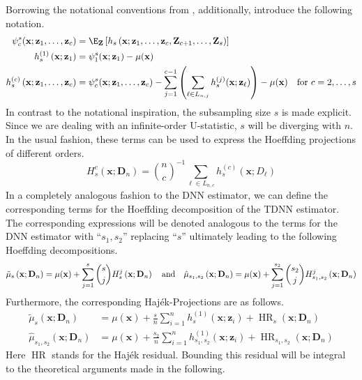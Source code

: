 Borrowing the notational conventions from \citet{lee_u-statistics_2019}, additionally, introduce the following notation.
\begin{align}
	\psi_{c}^{s}(\mathbf{x}; \mathbf{z}_{1}, \dotsc, \mathbf{z}_{c})
	 & = \E_{\mathbf{Z}}\left[h_{s}\left(\mathbf{x}; \mathbf{z}_{1}, \dotsc, \mathbf{z}_{c}, \mathbf{Z}_{c+1}, \dotsc, \mathbf{Z}_{s}\right)\right]                                            \\
	h_{s}^{(1)}\left(\mathbf{x}; \mathbf{z}_{1}\right)
	 & = \psi_{1}^{s}(\mathbf{x}; \mathbf{z}_{1}) - \mu(\mathbf{x})                                                                                                                            \\
	h_{s}^{(c)}\left(\mathbf{x}; \mathbf{z}_{1}, \dotsc, \mathbf{z}_{c}\right)
	 & = \psi_{c}^{s}(\mathbf{x}; \mathbf{z}_{1}, \dotsc, \mathbf{z}_{c}) - \sum_{j = 1}^{c-1}\left(\sum_{\ell \in L_{n,j}}h_{s}^{(j)}(\mathbf{x}; \mathbf{z}_{\ell})\right) - \mu(\mathbf{x})
	\quad \text{for } c = 2, \dotsc, s
\end{align}
In contrast to the notational inspiration, the subsampling size $s$ is made explicit.
Since we are dealing with an infinite-order U-statistic, $s$ will be diverging with $n$.
In the usual fashion, these terms can be used to express the Hoeffding projections of different orders.
\begin{equation}
	H_{s}^{c}\left(\mathbf{x}; \mathbf{D}_n\right)
	= \binom{n}{c}^{-1} \sum_{\ell \in L_{n,c}} h^{(c)}_{s}(\mathbf{x}; D_{\ell})
\end{equation}
In a completely analogous fashion to the DNN estimator, we can define the corresponding terms for the Hoeffding decomposition of the TDNN estimator.
The corresponding expressions will be denoted analogous to the terms for the DNN estimator with ``$s_1, s_2$'' replacing ``$s$'' ultimately leading to the following Hoeffding decompositions.
\begin{equation}
	\tilde{\mu}_{s}\left(\mathbf{x}; \mathbf{D}_n\right)
	= \mu(\mathbf{x}) + \sum_{j = 1}^{s}\binom{s}{j}H_{s}^{j}\left(\mathbf{x}; \mathbf{D}_n\right)\\
	\quad \text{and} \quad
	\hat{\mu}_{s_1, s_2}\left(\mathbf{x}; \mathbf{D}_n\right)
	= \mu(\mathbf{x}) + \sum_{j = 1}^{s_2}\binom{s_2}{j}H_{s_1, s_2}^{j}\left(\mathbf{x}; \mathbf{D}_n\right)
\end{equation}
Furthermore, the corresponding Haj\'ek-Projections are as follows.
\begin{equation}
	\begin{aligned}
		\tilde{\mu}_{s}\left(\mathbf{x}; \mathbf{D}_n\right)
		 & = \mu(\mathbf{x}) + \frac{s}{n}\sum_{i = 1}^{n}h^{(1)}_{s}(\mathbf{x}; \mathbf{z}_{i})
		+ \operatorname{HR}_{s}(\mathbf{x}; \mathbf{D}_n)                                                   \\
		\hat{\mu}_{s_1, s_2}\left(\mathbf{x}; \mathbf{D}_n\right)
		 & = \mu(\mathbf{x}) + \frac{s_2}{n}\sum_{i = 1}^{n} h^{(1)}_{s_1, s_2}(\mathbf{x}; \mathbf{z}_{i})
		+ \operatorname{HR}_{s_1, s_2}(\mathbf{x}; \mathbf{D}_n)
	\end{aligned}
\end{equation}
Here $\operatorname{HR}$ stands for the Haj\'ek residual.
Bounding this residual will be integral to the theoretical arguments made in the following.